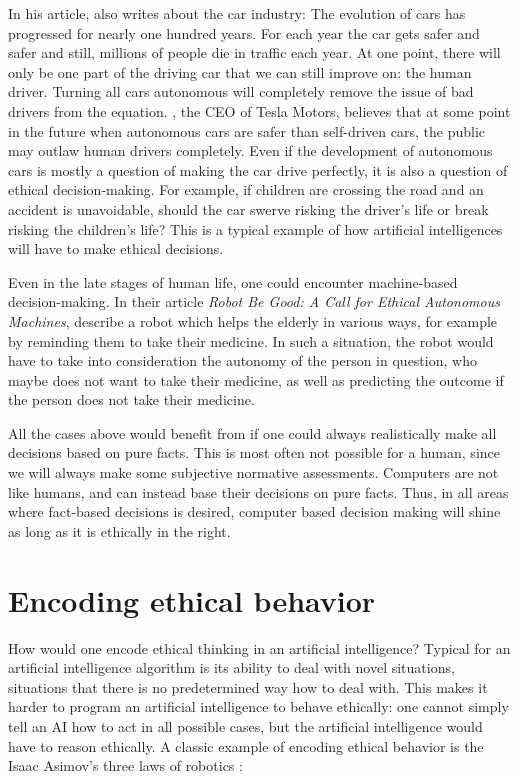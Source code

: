\documentclass[11pt]{article}
\begin{document}
In his article, \citeauthor{Chatfield2014automate} also writes about the car industry: The evolution of cars has progressed for nearly one hundred years. For each year the car gets safer and safer and still, millions of people die in traffic each year. At one point, there will only be one part of the driving car that we can still improve on: the human driver. Turning all cars autonomous will completely remove the issue of bad drivers from the equation. , the CEO of Tesla Motors, believes that at some point in the future when autonomous cars are safer than self-driven cars, the public may outlaw human drivers completely. Even if the development of autonomous cars is mostly a question of making the car drive perfectly, it is also a question of ethical decision-making. For example, if children are crossing the road and an accident is unavoidable, should the car swerve risking the driver's life or break risking the children's life? This is a typical example of how artificial intelligences will have to make ethical decisions.

Even in the late stages of human life, one could encounter machine-based decision-making. In their article \textit{Robot Be Good: A Call for Ethical Autonomous Machines}, \citeauthor{anderson2010robot} describe a robot which helps the elderly in various ways, for example by reminding them to take their medicine. In such a situation, the robot would have to take into consideration the autonomy of the person in question, who maybe does not want to take their medicine, as well as predicting the outcome if the person does not take their medicine. 

All the cases above would benefit from if one could always realistically make all decisions based on pure facts. This is most often not possible for a human, since we will always make some subjective normative assessments. Computers are not like humans, and can instead base their decisions on pure facts. Thus, in all areas where fact-based decisions is desired, computer based decision making will shine as long as it is ethically in the right. 

\section{Encoding ethical behavior}
\label{sec:encodingEthical}

How would one encode ethical thinking in an artificial intelligence? Typical for an artificial
intelligence algorithm is its ability to deal with novel situations, situations that there is no 
predetermined way how to deal with. This makes it harder to program an artificial intelligence 
to behave ethically: one cannot simply tell an AI how to act in all possible cases, but the artificial
intelligence would have to reason ethically. A classic example of encoding ethical behavior is the Isaac 
Asimov's three laws of robotics \cite{asimov1950irobot}:
\end{document}
